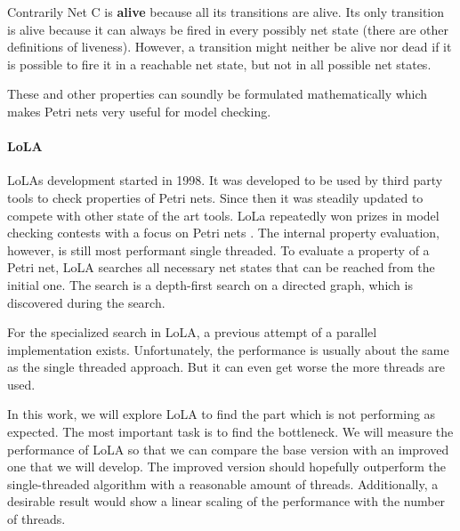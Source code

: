Contrarily Net C is \textbf{alive} because all its transitions are alive. Its only transition is alive because it can always be fired in every possibly net state (there are other definitions of liveness\cite{murata1989petri}). However, a transition might neither be alive nor dead if it is possible to fire it in a reachable net state, but not in all possible net states.

These and other properties can soundly be formulated mathematically which makes Petri nets very useful for model checking.



\paragraph*{LoLA}
LoLAs development started in 1998. It was developed to be used by third party tools to check properties of Petri nets\cite{schmidt2000lola}. Since then it was steadily updated to compete with other state of the art tools. LoLa repeatedly won prizes in model checking contests with a focus on Petri nets \cite{MCC2017}.
The internal property evaluation, however, is still most performant single threaded. To evaluate a property of a Petri net, LoLA searches all necessary net states that can be reached from the initial one. The search is a depth-first search on a directed graph, which is discovered during the search.

For the specialized search in LoLA, a previous attempt of a parallel implementation exists. Unfortunately, the performance is usually about the same as the single threaded approach. But it can even get worse the more threads are used.

In this work, we will explore LoLA to find the part which is not performing as expected. The most important task is to find the bottleneck. We will measure the performance of LoLA so that we can compare the base version with an improved one that we will develop. The improved version should hopefully outperform the single-threaded algorithm with a reasonable amount of threads. Additionally, a desirable result would show a linear scaling of the performance with the number of threads.
